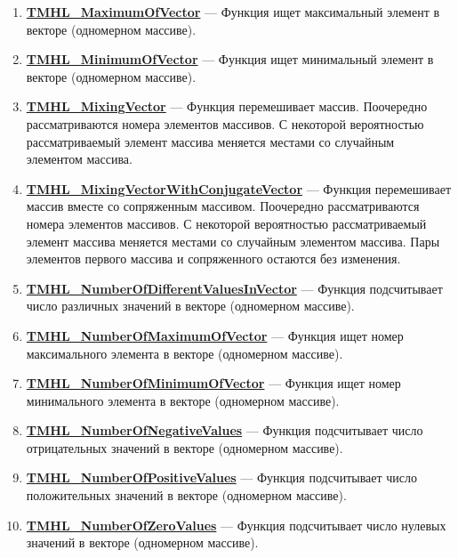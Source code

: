 \documentclass[a4paper,12pt]{article}
\begin{document}
\begin{enumerate}
\item \textbf{\hyperref[TMHL_MaximumOfVector]{TMHL\_MaximumOfVector}} --- Функция ищет максимальный элемент в векторе (одномерном массиве).

\item \textbf{\hyperref[TMHL_MinimumOfVector]{TMHL\_MinimumOfVector}} --- Функция ищет минимальный элемент в векторе (одномерном массиве).

\item \textbf{\hyperref[TMHL_MixingVector]{TMHL\_MixingVector}} --- Функция перемешивает массив. Поочередно рассматриваются номера элементов массивов. С некоторой вероятностью рассматриваемый элемент массива меняется местами со случайным элементом массива.

\item \textbf{\hyperref[TMHL_MixingVectorWithConjugateVector]{TMHL\_MixingVectorWithConjugateVector}} --- Функция перемешивает массив вместе со сопряженным массивом. Поочередно рассматриваются номера элементов массивов. С некоторой вероятностью рассматриваемый элемент массива меняется местами со случайным элементом массива. Пары элементов первого массива и сопряженного остаются без изменения.

\item \textbf{\hyperref[TMHL_NumberOfDifferentValuesInVector]{TMHL\_NumberOfDifferentValuesInVector}} --- Функция подсчитывает число различных значений в векторе (одномерном массиве).

\item \textbf{\hyperref[TMHL_NumberOfMaximumOfVector]{TMHL\_NumberOfMaximumOfVector}} --- Функция ищет номер максимального элемента в векторе (одномерном массиве).

\item \textbf{\hyperref[TMHL_NumberOfMinimumOfVector]{TMHL\_NumberOfMinimumOfVector}} --- Функция ищет номер минимального элемента в векторе (одномерном массиве).

\item \textbf{\hyperref[TMHL_NumberOfNegativeValues]{TMHL\_NumberOfNegativeValues}} --- Функция подсчитывает число отрицательных значений в векторе (одномерном массиве).

\item \textbf{\hyperref[TMHL_NumberOfPositiveValues]{TMHL\_NumberOfPositiveValues}} --- Функция подсчитывает число положительных значений в векторе (одномерном массиве).

\item \textbf{\hyperref[TMHL_NumberOfZeroValues]{TMHL\_NumberOfZeroValues}} --- Функция подсчитывает число нулевых значений в векторе (одномерном массиве).


\end{enumerate}
\end{document}
